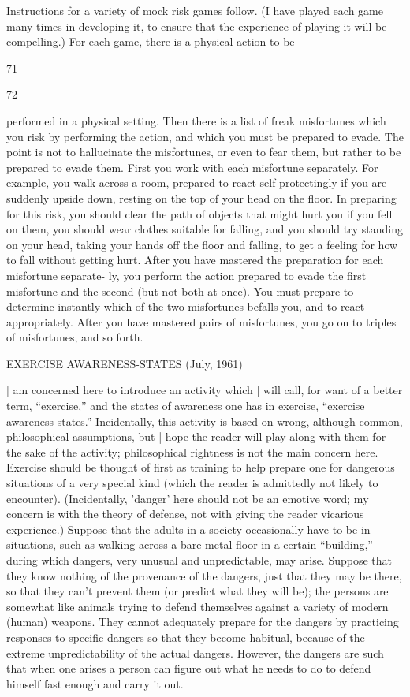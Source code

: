 Instructions for a variety of mock risk games follow. (I have played each 
game many times in developing it, to ensure that the experience of playing 
it will be compelling.) For each game, there is a physical action to be 


71 


72 


performed in a physical setting. Then there is a list of freak misfortunes 
which you risk by performing the action, and which you must be prepared 
to evade. The point is not to hallucinate the misfortunes, or even to fear 
them, but rather to be prepared to evade them. First you work with each 
misfortune separately. For example, you walk across a room, prepared to 
react self-protectingly if you are suddenly upside down, resting on the top 
of your head on the floor. In preparing for this risk, you should clear the path 
of objects that might hurt you if you fell on them, you should wear clothes 
suitable for falling, and you should try standing on your head, taking your 
hands off the floor and falling, to get a feeling for how to fall without getting 
hurt. After you have mastered the preparation for each misfortune separate- 
ly, you perform the action prepared to evade the first misfortune and the 
second (but not both at once). You must prepare to determine instantly 
which of the two misfortunes befalls you, and to react appropriately. After 
you have mastered pairs of misfortunes, you go on to triples of misfortunes, 
and so forth. 


EXERCISE AWARENESS-STATES (July, 1961) 


| am concerned here to introduce an activity which | will call, for want of 
a better term, “exercise,” and the states of awareness one has in exercise, 
“exercise awareness-states.” Incidentally, this activity is based on wrong, 
although common, philosophical assumptions, but | hope the reader will play 
along with them for the sake of the activity; philosophical rightness is not 
the main concern here. Exercise should be thought of first as training to help 
prepare one for dangerous situations of a very special kind (which the 
reader is admittedly not likely to encounter). (Incidentally, ’danger’ here 
should not be an emotive word; my concern is with the theory of defense, 
not with giving the reader vicarious experience.) Suppose that the adults in 
a society occasionally have to be in situations, such as walking across a 
bare metal floor in a certain “building,” during which dangers, very unusual 
and unpredictable, may arise. Suppose that they know nothing of the 
provenance of the dangers, just that they may be there, so that they can’t 
prevent them (or predict what they will be); the persons are somewhat like 
animals trying to defend themselves against a variety of modern (human) 
weapons. They cannot adequately prepare for the dangers by practicing 
responses to specific dangers so that they become habitual, because of the 
extreme unpredictability of the actual dangers. However, the dangers are 
such that when one arises a person can figure out what he needs to do to 
defend himself fast enough and carry it out. 

